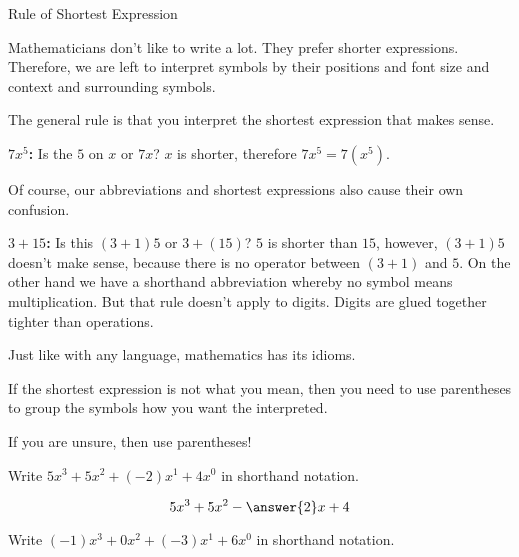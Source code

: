 \documentclass{ximera}
\begin{document}
\begin{warning} Rule of Shortest Expression

Mathematicians don't like to write a lot.  They prefer shorter expressions.  Therefore, we are left to interpret symbols by their positions and font size and context and surrounding symbols.

The general rule is that you interpret the shortest expression that makes sense.


\textbf{$7x^5$:} Is the $5$ on $x$ or $7x$?  $x$ is shorter, therefore $7x^5 = 7 (x^5)$.

Of course, our abbreviations and shortest expressions also cause their own confusion.

\textbf{$3+15$:} Is this $(3+1)5$ or $3+(15)$?  $5$ is shorter than $15$, however, $(3+1)5$ doesn't make sense, because there is no operator between $(3+1)$ and $5$.  On the other hand we have a shorthand abbreviation whereby no symbol means multiplication.  But that rule doesn't apply to digits.  Digits are glued together tighter than operations.

Just like with any language, mathematics has its idioms.

If the shortest expression is not what you mean, then you need to use parentheses to group the symbols how you want the interpreted.

If you are unsure, then use parentheses!

\end{warning}



\begin{question}

Write $5 x^3 + 5 x^2 + (-2) x^1 + 4 x^0$ in shorthand notation.


\[
5 x^3 + 5 x^2 - \answer{2} x + 4  
\]

\end{question}





\begin{question}

Write $(-1) x^3 + 0 x^2 + (-3) x^1 + 6 x^0$ in shorthand notation.


\begin{multipleChoice}
\end{multipleChoice}

\end{question}
\end{document}
